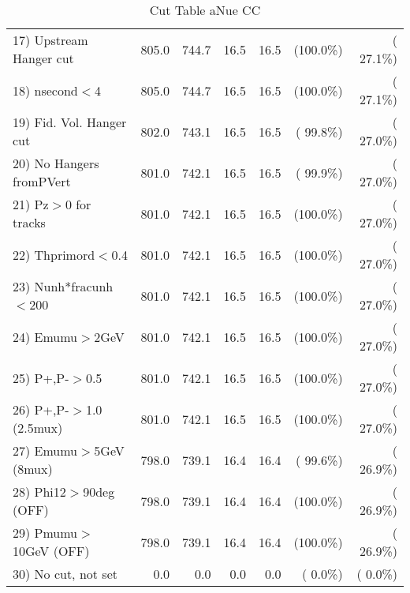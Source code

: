 \begin{table}[h!]
\begin{tabular}{||l||r|r|r|r|r|r||}
 17) Upstream Hanger cut  &        805.0 &        744.7 &         16.5 &         16.5 & (100.0\%) & ( 27.1\%) \\
 18) nsecond$<$4          &        805.0 &        744.7 &         16.5 &         16.5 & (100.0\%) & ( 27.1\%) \\
 19) Fid. Vol. Hanger cut &        802.0 &        743.1 &         16.5 &         16.5 & ( 99.8\%) & ( 27.0\%) \\
 20) No Hangers fromPVert &        801.0 &        742.1 &         16.5 &         16.5 & ( 99.9\%) & ( 27.0\%) \\
 21) Pz$>$0 for tracks    &        801.0 &        742.1 &         16.5 &         16.5 & (100.0\%) & ( 27.0\%) \\
 22) Thprimord$<$0.4      &        801.0 &        742.1 &         16.5 &         16.5 & (100.0\%) & ( 27.0\%) \\
 23) Nunh*fracunh$<$200   &        801.0 &        742.1 &         16.5 &         16.5 & (100.0\%) & ( 27.0\%) \\
 24) Emumu$>$2GeV         &        801.0 &        742.1 &         16.5 &         16.5 & (100.0\%) & ( 27.0\%) \\
 25) P+,P-$>$0.5          &        801.0 &        742.1 &         16.5 &         16.5 & (100.0\%) & ( 27.0\%) \\
 26) P+,P-$>$1.0 (2.5mux) &        801.0 &        742.1 &         16.5 &         16.5 & (100.0\%) & ( 27.0\%) \\
 27) Emumu$>$5GeV  (8mux) &        798.0 &        739.1 &         16.4 &         16.4 & ( 99.6\%) & ( 26.9\%) \\
 28) Phi12$>$90deg  (OFF) &        798.0 &        739.1 &         16.4 &         16.4 & (100.0\%) & ( 26.9\%) \\
 29) Pmumu$>$10GeV  (OFF) &        798.0 &        739.1 &         16.4 &         16.4 & (100.0\%) & ( 26.9\%) \\
 30) No cut, not set      &          0.0 &          0.0 &          0.0 &          0.0 & (  0.0\%) & (  0.0\%) \\
 \hline
 \hline
 \end{tabular}
 \caption{Cut Table  aNue CC  }
 \label{tab-cutheavy_neutrino_3.000}
 \end{table}
